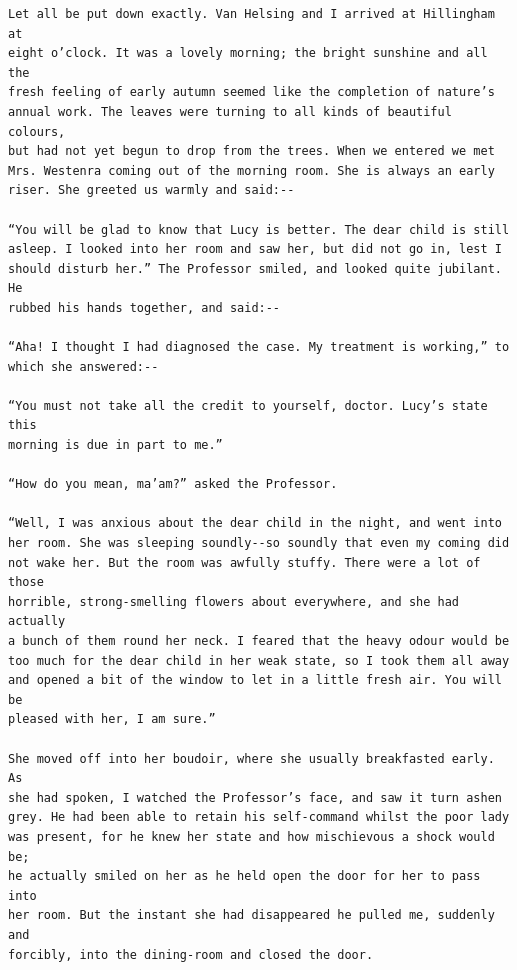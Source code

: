 \documentclass{article}
\begin{document}
\begin{verbatim}
Let all be put down exactly. Van Helsing and I arrived at Hillingham at
eight o’clock. It was a lovely morning; the bright sunshine and all the
fresh feeling of early autumn seemed like the completion of nature’s
annual work. The leaves were turning to all kinds of beautiful colours,
but had not yet begun to drop from the trees. When we entered we met
Mrs. Westenra coming out of the morning room. She is always an early
riser. She greeted us warmly and said:--

“You will be glad to know that Lucy is better. The dear child is still
asleep. I looked into her room and saw her, but did not go in, lest I
should disturb her.” The Professor smiled, and looked quite jubilant. He
rubbed his hands together, and said:--

“Aha! I thought I had diagnosed the case. My treatment is working,” to
which she answered:--

“You must not take all the credit to yourself, doctor. Lucy’s state this
morning is due in part to me.”

“How do you mean, ma’am?” asked the Professor.

“Well, I was anxious about the dear child in the night, and went into
her room. She was sleeping soundly--so soundly that even my coming did
not wake her. But the room was awfully stuffy. There were a lot of those
horrible, strong-smelling flowers about everywhere, and she had actually
a bunch of them round her neck. I feared that the heavy odour would be
too much for the dear child in her weak state, so I took them all away
and opened a bit of the window to let in a little fresh air. You will be
pleased with her, I am sure.”

She moved off into her boudoir, where she usually breakfasted early. As
she had spoken, I watched the Professor’s face, and saw it turn ashen
grey. He had been able to retain his self-command whilst the poor lady
was present, for he knew her state and how mischievous a shock would be;
he actually smiled on her as he held open the door for her to pass into
her room. But the instant she had disappeared he pulled me, suddenly and
forcibly, into the dining-room and closed the door.


\end{verbatim}
\end{document}
